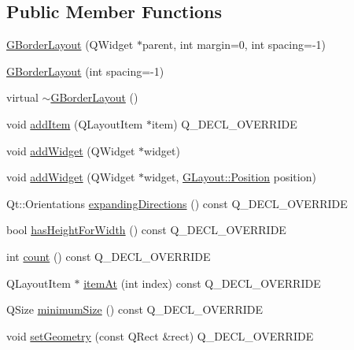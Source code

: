 \subsection*{Public Member Functions}
\begin{DoxyCompactItemize}
\item 
\mbox{\hyperlink{classGBorderLayout_a82b7e21e5946cb9375db230c211ff5bb}{G\+Border\+Layout}} (Q\+Widget $\ast$parent, int margin=0, int spacing=-\/1)
\item 
\mbox{\hyperlink{classGBorderLayout_afa818bcf00fbeaa187cc34ed8ec1672e}{G\+Border\+Layout}} (int spacing=-\/1)
\item 
virtual \mbox{\hyperlink{classGBorderLayout_aecb2b1731ec37f3fab98ad836e31718e}{$\sim$\+G\+Border\+Layout}} ()
\item 
void \mbox{\hyperlink{classGBorderLayout_ac8fb6b47de0f28c7916b8987efa7a1b0}{add\+Item}} (Q\+Layout\+Item $\ast$item) Q\+\_\+\+D\+E\+C\+L\+\_\+\+O\+V\+E\+R\+R\+I\+DE
\item 
void \mbox{\hyperlink{classGBorderLayout_a24cb17784993de98812e9ce0e280fdb7}{add\+Widget}} (Q\+Widget $\ast$widget)
\item 
void \mbox{\hyperlink{classGBorderLayout_a54654e0c0a74b4fd777bf7e2ff9ca4c1}{add\+Widget}} (Q\+Widget $\ast$widget, \mbox{\hyperlink{classGLayout_ab91b34ae619fcdfcba4522b4f335bf83}{G\+Layout\+::\+Position}} position)
\item 
Qt\+::\+Orientations \mbox{\hyperlink{classGBorderLayout_ae056147b09028f32d1e9e6c2d9fb0bb8}{expanding\+Directions}} () const Q\+\_\+\+D\+E\+C\+L\+\_\+\+O\+V\+E\+R\+R\+I\+DE
\item 
bool \mbox{\hyperlink{classGBorderLayout_a2a0610d5e39948800e89572cb972d712}{has\+Height\+For\+Width}} () const Q\+\_\+\+D\+E\+C\+L\+\_\+\+O\+V\+E\+R\+R\+I\+DE
\item 
int \mbox{\hyperlink{classGBorderLayout_a9e27218280fd27ef41c64cb7e705249a}{count}} () const Q\+\_\+\+D\+E\+C\+L\+\_\+\+O\+V\+E\+R\+R\+I\+DE
\item 
Q\+Layout\+Item $\ast$ \mbox{\hyperlink{classGBorderLayout_a1c4494f3e99dfeb9ee9de910781a18f7}{item\+At}} (int index) const Q\+\_\+\+D\+E\+C\+L\+\_\+\+O\+V\+E\+R\+R\+I\+DE
\item 
Q\+Size \mbox{\hyperlink{classGBorderLayout_a186810cbd3b80e47e72d510e05a3d512}{minimum\+Size}} () const Q\+\_\+\+D\+E\+C\+L\+\_\+\+O\+V\+E\+R\+R\+I\+DE
\item 
void \mbox{\hyperlink{classGBorderLayout_a0fc96b07b82dcdc7c60a5dcaa8c32c5c}{set\+Geometry}} (const Q\+Rect \&rect) Q\+\_\+\+D\+E\+C\+L\+\_\+\+O\+V\+E\+R\+R\+I\+DE

\end{DoxyCompactItemize}
